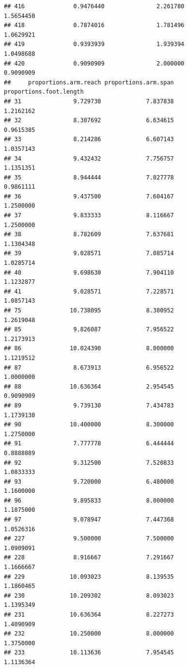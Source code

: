 \documentclass[]{article}
\begin{document}
\begin{verbatim}
## 416              0.9476440               2.261780                1.5654450
## 418              0.7874016               1.781496                1.0629921
## 419              0.9393939               1.939394                1.0498688
## 420              0.9090909               2.000000                0.9090909
##     proportions.arm.reach proportions.arm.span proportions.foot.length
## 31               9.729730             7.837838               1.2162162
## 32               8.307692             6.634615               0.9615385
## 33               8.214286             6.607143               1.0357143
## 34               9.432432             7.756757               1.1351351
## 35               8.944444             7.027778               0.9861111
## 36               9.437500             7.604167               1.2500000
## 37               9.833333             8.116667               1.2500000
## 38               8.782609             7.637681               1.1304348
## 39               9.028571             7.085714               1.0285714
## 40               9.698630             7.904110               1.1232877
## 41               9.028571             7.228571               1.0857143
## 75              10.738095             8.380952               1.2619048
## 85               9.826087             7.956522               1.2173913
## 86              10.024390             8.000000               1.1219512
## 87               8.673913             6.956522               1.0000000
## 88              10.636364             2.954545               0.9090909
## 89               9.739130             7.434783               1.1739130
## 90              10.400000             8.300000               1.2750000
## 91               7.777778             6.444444               0.8888889
## 92               9.312500             7.520833               1.0833333
## 93               9.720000             6.480000               1.1600000
## 96               9.895833             8.000000               1.1875000
## 97               9.078947             7.447368               1.0526316
## 227              9.500000             7.500000               1.0909091
## 228              8.916667             7.291667               1.1666667
## 229             10.093023             8.139535               1.1860465
## 230             10.209302             8.093023               1.1395349
## 231             10.636364             8.227273               1.4090909
## 232             10.250000             8.000000               1.3750000
## 233             10.113636             7.954545               1.1136364

\end{verbatim}
\end{document}
